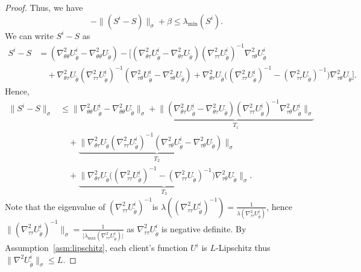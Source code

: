 \documentclass{article}
\theoremstyle{definition}
\begin{document}
\begin{proof}
\noindent Thus, we have
\begin{equation*}
-\|(S^i-S)\|_{\sigma}+\beta\leq   \lambda_{\min}(S^i).
\end{equation*}
We can write $S^i-S$ as
   \begin{align*}
        S^i - S &= (\nabla_{\theta\theta}^2 U_{\tilde\theta}^i - \nabla_{\theta\theta}^2 U_{\tilde\theta})- \Big[ (\nabla_{\theta\tau}^2 U_{\tilde\theta}^i - \nabla_{\theta\tau}^2 U_{\tilde\theta}) (\nabla_{\tau\tau}^2 U_{\tilde\theta}^i)^{-1} \nabla_{\tau\theta}^2 U_{\tilde\theta}^i \\
        &\quad + \nabla_{\theta\tau}^2 U_{\tilde\theta} (\nabla_{\tau\tau}^2 U_{\tilde\theta}^i)^{-1} (\nabla_{\tau\theta}^2 U_{\tilde\theta}^i - \nabla_{\tau\theta}^2 U_{\tilde\theta}) + \nabla_{\theta\tau}^2 U_{\tilde\theta} \Big( (\nabla_{\tau\tau}^2 U_{\tilde\theta}^i)^{-1} - (\nabla_{\tau\tau}^2 U_{\tilde\theta})^{-1} \Big) \nabla_{\tau\theta}^2 U_{\tilde\theta} \Big].
    \end{align*}
Hence,
   \begin{align*}
        \|S^i - S\|_{\sigma} &\leq \|\nabla_{\theta\theta}^2 U_{\tilde\theta}^i - \nabla_{\theta\theta}^2 U_{\tilde\theta}\|_{\sigma}+\underbrace{\|(\nabla_{\theta\tau}^2 U_{\tilde\theta}^i - \nabla_{\theta\tau}^2 U_{\tilde\theta}) (\nabla_{\tau\tau}^2 U_{\tilde\theta}^i)^{-1} \nabla_{\tau\theta}^2 U_{\tilde\theta}^i\|_{\sigma}}_{\text{$T_1$}} \\
        &\quad +\underbrace{\|\nabla_{\theta\tau}^2 U_{\tilde\theta} (\nabla_{\tau\tau}^2 U_{\tilde\theta}^i)^{-1} (\nabla_{\tau\theta}^2 U_{\tilde\theta}^i - \nabla_{\tau\theta}^2 U_{\tilde\theta})\|_{\sigma}}_{\text{$T_2$}} \\
        &\quad + \underbrace{\|\nabla_{\theta\tau}^2 U_{\tilde\theta} \Big( (\nabla_{\tau\tau}^2 U_{\tilde\theta}^i)^{-1} - (\nabla_{\tau\tau}^2 U_{\tilde\theta})^{-1} \Big) \nabla_{\tau\theta}^2 U_{\tilde\theta} \|_{\sigma}}_{\text{$T_3$}}.
    \end{align*}
Note that the eigenvalue of $(\nabla_{\tau\tau}^2 U_{\tilde\theta}^i)^{-1}$is $\lambda\left((\nabla_{\tau\tau}^2 U_{\tilde\theta}^i)^{-1}\right)=\frac{1}{\lambda\left(\nabla_{\tau\tau}^2 U_{\tilde\theta}^i\right)}$, hence $\|(\nabla_{\tau\tau}^2 U_{\tilde\theta}^i)^{-1}\|_{\sigma}=\frac{1}{\vert\lambda_{\max}(\nabla_{\tau\tau}^2 U_{\tilde\theta}^i)\vert}$ as $\nabla_{\tau\tau}^2 U_{\tilde\theta}^i$ is negative definite.
By Assumption~\ref{asm:lipschitz}, each client's function $U^i$ is $L$-Lipschitz  thus $\|\nabla^2 U_{\tilde\theta}^i\|_{\sigma}\leq L$. 

\end{proof}
\end{document}
